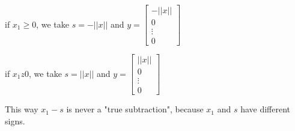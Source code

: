 \documentclass[10pt]{report}
\begin{document}
\begin{list}{}{}
	\item if $x_1 \geq 0$, we take $s = -||x||$ and $y = \left[\begin{array}{c}
	-||x||\\0\\\vdots\\0
	\end{array}\right]$
	\item if $x_1 z 0$, we take $s = ||x||$ and $y = \left[\begin{array}{c}
	||x||\\0\\\vdots\\0
	\end{array}\right]$
\end{list}
This way $x_1 - s$ is never a "true subtraction", because $x_1$ and $s$ have different signs.
\end{document}
